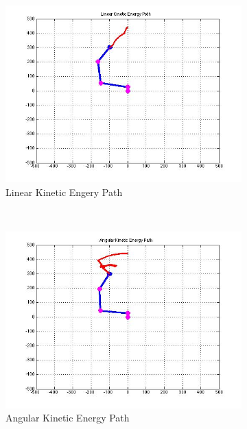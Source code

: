 \documentclass{article}
\begin{document}
\begin{figure}[htb]
\centering
\begin{subfigure}[b]{0.33\textwidth}
\centering
\includegraphics[scale=.33]{PathPics/Energy_Linear_Path.jpg}
\caption{Linear Kinetic Engery Path}
\end{subfigure}%
~ 
\begin{subfigure}[b]{0.33\textwidth}
\centering
\includegraphics[scale=.33]{PathPics/Energy_Angular_Path.jpg}
\caption{Angular Kinetic Energy Path}
\end{subfigure}%
~ 
\begin{subfigure}[b]{0.33\textwidth}
\centering

\end{subfigure}
\end{figure}
\end{document}
